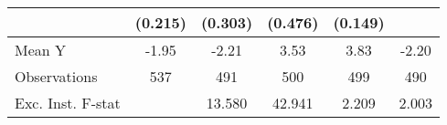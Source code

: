 {\begin{tabular}{l*{5}{c}}
            &     (0.215)         &     (0.303)         &     (0.476)         &     (0.149)         &                     \\
\midrule
Mean Y      &       -1.95         &       -2.21         &        3.53         &        3.83         &       -2.20         \\
Observations&         537         &         491         &         500         &         499         &         490         \\
Exc. Inst. F-stat&                     &      13.580         &      42.941         &       2.209         &       2.003         \\
\bottomrule
\end{tabular}
}
